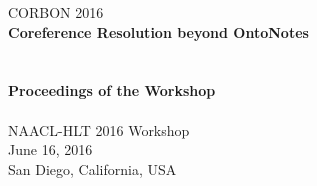 \documentclass[11pt]{article}
\begin{document}
  \begin{center}
  \Large CORBON 2016\\
  \vspace*{55mm}
    {\bf
    \LARGE
    Coreference Resolution beyond OntoNotes \\

    \hspace*{1cm}\\ \hspace*{1cm} \\

    \Large
    Proceedings of the Workshop \\
    \vspace{4.9cm}
    \hspace*{1cm}} \\ %
    \vspace{43mm}
    \Large
    NAACL-HLT 2016 Workshop \\
    June 16, 2016\\
    San Diego, California, USA

  \end{center}
\end{document}
